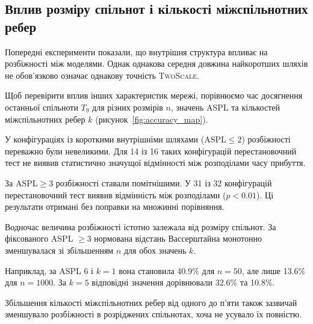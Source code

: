 \documentclass[a4paper,fleqn]{cas-sc}
\newcommand{\TS}{\textup{\textsc{TwoScale}}}
\begin{document}
\subsection{Вплив розміру спільнот
і кількості міжспільнотних ребер}
\label{sec:res_size}

Попередні експерименти показали,
що внутрішня структура впливає
на розбіжності між моделями.
Однак однакова середня довжина
найкоротших шляхів не обов'язково
означає однакову точність \TS{}.

Щоб перевірити вплив інших
характеристик мережі, порівнюємо
час досягнення останньої спільноти
$T_9$ для різних розмірів $n$,
значень ASPL та кількостей
міжспільнотних ребер $k$
(рисунок~\ref{fig:accuracy_map}).

У конфігураціях із короткими
внутрішніми шляхами
($\mathrm{ASPL}\leq2$)
розбіжності переважно були невеликими.
Для 14 із 16 таких конфігурацій
перестановочний тест не виявив
статистично значущої відмінності
між розподілами часу прибуття.

За $\mathrm{ASPL}\geq3$
розбіжності ставали помітнішими.
У 31 із 32 конфігурацій
перестановочний тест виявив
відмінність між розподілами
($p<0.01$). Ці результати
отримані без поправки
на множинні порівняння.

Водночас величина розбіжності
істотно залежала від розміру
спільнот. За фіксованого
ASPL $\geq3$ нормована
відстань Вассерштайна
монотонно зменшувалася
зі збільшенням $n$
для обох значень $k$.

Наприклад, за ASPL 6 і $k=1$
вона становила 40.9\%
для $n=50$, але лише 13.6\%
для $n=1000$.
За $k=5$ відповідні значення
дорівнювали 32.6\% та 10.8\%.

Збільшення кількості
міжспільнотних ребер від одного
до п'яти також зазвичай
зменшувало розбіжності
в розріджених спільнотах,
хоча не усувало їх повністю.
\end{document}
